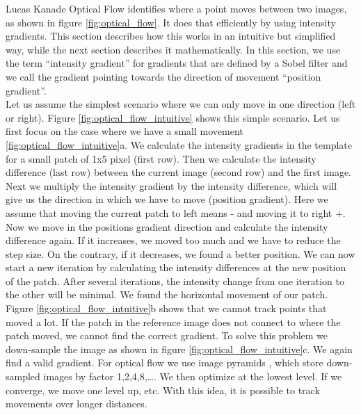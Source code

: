 \documentclass[11pt,a4paper,titlepage,oneside]{report}
\begin{document}
Lucas Kanade Optical Flow identifies where a point moves between two images, as shown in figure \ref{fig:optical_flow}. It does that efficiently by using intensity gradients. This section describes how this works in an intuitive but simplified way, while the next section describes it mathematically. In this section, we use the term ``intensity gradient'' for gradients that are defined by a Sobel filter and we call the gradient pointing towards the direction of movement ``position gradient''.\\
Let us assume the simplest scenario where we can only move in one direction (left or right). Figure \ref{fig:optical_flow_intuitive} shows this simple scenario. Let us first focus on the case where we have a small movement \ref{fig:optical_flow_intuitive}a. We calculate the intensity gradients in the template for a small patch of 1x5 pixel (first row). Then we calculate the intensity difference (last row) between the current image (second row) and the first image. Next we multiply the intensity gradient by the intensity difference, which will give us the direction in which we have to move (position gradient). Here we assume that moving the current patch to left means - and moving it to right +. Now we move in the positions gradient direction and calculate the intensity difference again. If it increases, we moved too much and we have to reduce the step size. On the contrary, if it decreases, we found a better position. We can now start a new iteration by calculating the intensity differences at the new position of the patch. After several iterations, the intensity change from one iteration to the other will be minimal. We found the horizontal movement of our patch.\\
Figure \ref{fig:optical_flow_intuitive}b shows that we cannot track points that moved a lot. If the patch in the reference image does not connect to where the patch moved, we cannot find the correct gradient. To solve this problem we down-sample the image as shown in figure \ref{fig:optical_flow_intuitive}c. We again find a valid gradient. For optical flow we use image pyramids \cite{rvc}, which store down-sampled images by factor 1,2,4,8,\dots. We then optimize at the lowest level. If we converge, we move one level up, etc. With this idea, it is possible to track movements over longer distances.
\end{document}
